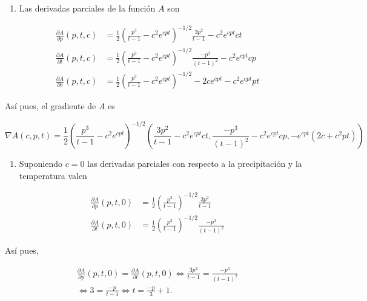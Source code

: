 \documentclass[
  spanish,
  a4paper,
]{scrreport}
\providecommand{\tightlist}{%
  \setlength{\itemsep}{0pt}\setlength{\parskip}{0pt}}
\theoremstyle{definition}
\theoremstyle{remark}
\begin{document}
\begin{tcolorbox}[enhanced jigsaw, arc=.35mm, bottomrule=.15mm, bottomtitle=1mm, breakable, colback=white, colbacktitle=quarto-callout-tip-color!10!white, colframe=quarto-callout-tip-color-frame, coltitle=black, left=2mm, leftrule=.75mm, opacityback=0, opacitybacktitle=0.6, rightrule=.15mm, title=\textcolor{quarto-callout-tip-color}{\faLightbulb}\hspace{0.5em}{Solución}, titlerule=0mm, toprule=.15mm, toptitle=1mm]

\begin{enumerate}
\def\labelenumi{\alph{enumi}.}
\tightlist
\item
  Las derivadas parciales de la función \(A\) son
\end{enumerate}

\begin{align*}
\frac{\partial A}{\partial p}(p,t,c)
&= \frac{1}{2}\left(\frac{{p^3 }}{{t - 1}} - c^2 e^{cpt}\right)^{-1/2} \frac{3p^2}{t-1}-c^2e^{cpt}ct\\
\frac{\partial A}{\partial t}(p,t,c)
&= \frac{1}{2}\left(\frac{{p^3 }}{{t - 1}} - c^2 e^{cpt}\right)^{-1/2} \frac{-p^3}{(t-1)^2}-c^2e^{cpt}cp\\
\frac{\partial A}{\partial c}(p,t,c)
&= \frac{1}{2}\left(\frac{{p^3 }}{{t - 1}} - c^2 e^{cpt}\right)^{-1/2} -2ce^{cpt}-c^2e^{cpt}pt
\end{align*}

Así pues, el gradiente de \(A\) es

\[
\nabla A(c,p,t) = \frac{1}{2}\left(\frac{{p^3 }}{{t - 1}} - c^2 e^{cpt}\right)^{-1/2} \left(\frac{3p^2}{t-1}-c^2e^{cpt}ct, \frac{-p^3}{(t-1)^2}-c^2e^{cpt}cp,  -e^{cpt}(2c+c^2pt)\right)
\]

\begin{enumerate}
\def\labelenumi{\alph{enumi}.}
\setcounter{enumi}{1}
\tightlist
\item
  Suponiendo \(c=0\) las derivadas parciales con respecto a la
  precipitación y la temperatura valen
\end{enumerate}

\begin{align*}
\frac{\partial A}{\partial p}(p,t,0)
&= \frac{1}{2}\left(\frac{{p^3 }}{{t - 1}}\right)^{-1/2} \frac{3p^2}{t-1}\\
\frac{\partial A}{\partial t}(p,t,0)
&= \frac{1}{2}\left(\frac{{p^3 }}{{t - 1}} \right)^{-1/2} \frac{-p^3}{(t-1)^2}
\end{align*}

Así pues,

\[
\begin{gathered}
\frac{\partial A}{\partial p}(p,t,0) = \frac{\partial A}{\partial t}(p,t,0) 
\Leftrightarrow \frac{3p^2}{t-1} = \frac{-p^3}{(t-1)^2} \\
\Leftrightarrow 3 = \frac{-p}{t-1} 
\Leftrightarrow t = \frac{-p}{3}+1.
\end{gathered}
\]

\end{tcolorbox}
\end{document}
